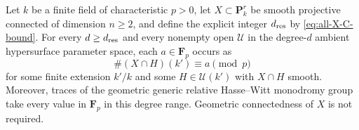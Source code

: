 \begin{theorem}\label{thm:all-X-residue-density}
Let $k$ be a finite field of characteristic $p>0$, let
$X\subset\mathbf P^r_k$ be smooth projective connected of
dimension $n\geq2$, and define the explicit integer
$d_{\rm res}$ by \eqref{eq:all-X-C-bound}.
For every $d\geq d_{\rm res}$ and every nonempty open
$\mathcal U$ in the degree-$d$ ambient hypersurface
parameter space, each $a\in\mathbf F_p$ occurs as
\[
 \#(X\cap H)(k')\equiv a\pmod p
\]
for some finite extension $k'/k$ and some
$H\in\mathcal U(k')$ with $X\cap H$ smooth.
Moreover, traces of the geometric generic relative
Hasse--Witt monodromy group take every value in
$\mathbf F_p$ in this degree range.
Geometric connectedness of $X$ is not required.
\end{theorem}

